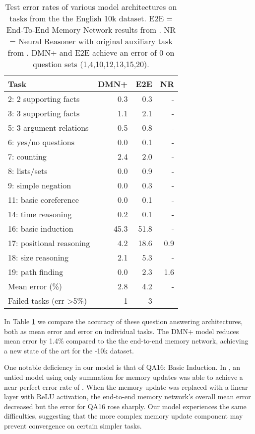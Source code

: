 \documentclass{article}
\begin{document}
\begin{table}
\centering
\begin{tabular}{lrrr}
Task & DMN+ & E2E & NR \\
\hline
2: 2 supporting facts & 0.3 & 0.3& -\\
3: 3 supporting facts & 1.1 & 2.1& -\\
5: 3 argument relations & 0.5 & 0.8& -\\
6: yes/no questions & 0.0 & 0.1& -\\
7: counting & 2.4 & 2.0& -\\
8: lists/sets & 0.0 & 0.9& -\\
9: simple negation & 0.0 & 0.3& -\\
11: basic coreference & 0.0 & 0.1& -\\
14: time reasoning & 0.2 & 0.1& -\\
16: basic induction & 45.3 & 51.8& -\\
17: positional reasoning & 4.2 & 18.6 & 0.9\\
18: size reasoning & 2.1 & 5.3 & -\\
19: path finding & 0.0 & 2.3 & 1.6\\
\hline
Mean error (\%) & 2.8 & 4.2 & - \\
Failed tasks (err \textgreater 5\%) & 1 & 3 & - \\
\end{tabular}
\caption{
Test error rates of various model architectures on tasks from the the \babi English 10k dataset.
E2E = End-To-End Memory Network results from \citet{Sukhbaatar2015}.
NR = Neural Reasoner with original auxiliary task from \citet{Peng2015}.
DMN+ and E2E achieve an error of 0 on \babi question sets (1,4,10,12,13,15,20).
}
\label{table:babi-sota}
\end{table}

In Table \ref{table:babi-sota} we compare the accuracy of these question answering architectures, both as mean error and error on individual tasks.
The DMN+ model reduces mean error by 1.4\% compared to the the end-to-end memory network, achieving a new state of the art for the \babi-10k dataset.

One notable deficiency in our model is that of QA16: Basic Induction.
In \citet{Sukhbaatar2015}, an untied model using only summation for memory updates was able to achieve a near perfect error rate of .
When the memory update was replaced with a linear layer with ReLU activation, the end-to-end memory network's overall mean error decreased but the error for QA16 rose sharply.
Our model experiences the same difficulties, suggesting that the more complex memory update component may prevent convergence on certain simpler tasks.
\end{document}
